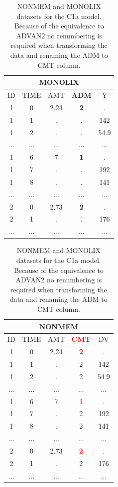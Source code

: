 \begin{table}[ht!]
\footnotesize
\parbox{.5\linewidth}{
\centering
\begin{tabular}{ccccc}
  \hline
     \multicolumn{5}{c}{\textbf{MONOLIX}} \\
  \hline
ID	& TIME  & AMT	 & \textbf{ADM} &	Y \\
  \hline
1	& 0	    & 2.24	& \textbf{2}	& . \\
1	& 1	    & .	& .		 	& 142 \\
1	& 2	    & .	& .	 		& 54.9 \\
...     &  ...     &  ...     & ...  			& ...\\
1	& 6	    & 7	& \textbf{1}	& . \\
1	& 7	    & .	& .			& 192 \\
1	& 8	    & .	& .			& 141 \\
...     &  ...     &  ...     & ...  			& ...\\
2	& 0	    & 2.73	& \textbf{2}	& . \\
2	& 1	    & . 	& .			& 176 \\
...     &  ...     &  ...     & ...  			& ...\\
\end{tabular}
}
\hfill
\parbox{.5\linewidth}{
\centering
\begin{tabular}{ccccc}
  \hline
   \multicolumn{5}{c}{\textbf{NONMEM}} \\
  \hline
ID	& TIME  & AMT	 & \textbf{\textcolor{red}{CMT}} &	DV \\
  \hline
1	& 0	    & 2.24	& \textbf{\textcolor{red}{2}}	& . \\
1	& 1	    & .	& 2		 	& 142 \\
1	& 2	    & .	& 2	 		& 54.9 \\
...     &  ...     &  ...     & ...  			& ...\\
1	& 6	    & 7	& \textbf{\textcolor{red}{1}}	& . \\
1	& 7	    & .	& 2			& 192 \\
1	& 8	    & .	& 2			& 141 \\
...     &  ...     &  ...     & ...  			& ...\\
2	& 0	    & 2.73	& \textbf{\textcolor{red}{2}}	& . \\
2	& 1	    & . 	& 2	 		& 176 \\
...     &  ...     &  ...     & ...  			& ...\\
\end{tabular}
}
\caption{NONMEM and MONOLIX datasets for the C1a model. Because of the equivalence to 
ADVAN2 no renumbering is required when transforming the data and renaming the ADM 
to CMT column.}
\label{tab:C1aTable}
\end{table}

